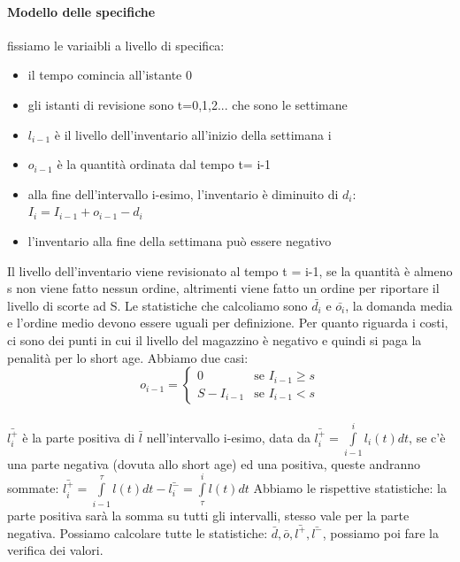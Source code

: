 \documentclass{article}
\begin{document}
\paragraph{Modello delle specifiche}fissiamo le variaibli a livello di specifica:
\begin{itemize}
\item il tempo comincia all'istante 0
\item gli istanti di revisione sono t=0,1,2... che sono le settimane
\item $l_{i-1}$ è il livello dell'inventario all'inizio della settimana i
\item $o_{i-1}$ è la quantità ordinata dal tempo t= i-1
\item alla fine dell'intervallo i-esimo, l'inventario è diminuito di $d_i$: $I_i = I_{i-1} + o_{i-1} - d_i$
\item l'inventario alla fine della settimana può essere negativo
\end{itemize}
Il livello dell'inventario viene revisionato al tempo t = i-1, se la quantità è almeno s non viene fatto nessun ordine, altrimenti viene fatto un ordine per riportare il livello di scorte ad S. Le statistiche che calcoliamo sono $\bar{d_i}$ e $\bar{o_i}$, la domanda media e l'ordine medio devono essere uguali per definizione. Per quanto riguarda i costi, ci sono dei punti in cui il livello del magazzino è negativo e quindi si paga la penalità per lo short age. Abbiamo due casi:
\[
o_{i-1} = 
\begin{cases}
0 & \text{se }I_{i-1} \geq s\\
S - I_{i-1} & \text{se }I_{i-1} < s
\end{cases}
\]
\\$\bar{l_i^+}$ è la parte positiva di $\bar{l}$ nell'intervallo i-esimo, data da $\bar{l_i^+} = \int\limits_{i-1}^{i} l_i(t) dt$, se c'è una parte negativa (dovuta allo short age) ed una positiva, queste andranno sommate: $\bar{l_i^+} = \int\limits_{i-1}^{\tau} l(t) dt - \bar{l_i^-} = \int\limits_{\tau}^{i} l(t) dt$ Abbiamo le rispettive statistiche: la parte positiva sarà la somma su tutti gli intervalli, stesso vale per la parte negativa. Possiamo calcolare tutte le statistiche: $\bar{d}, \bar{o}, \bar{l^+}, \bar{l^-}$, possiamo poi fare la verifica dei valori.
\end{document}
